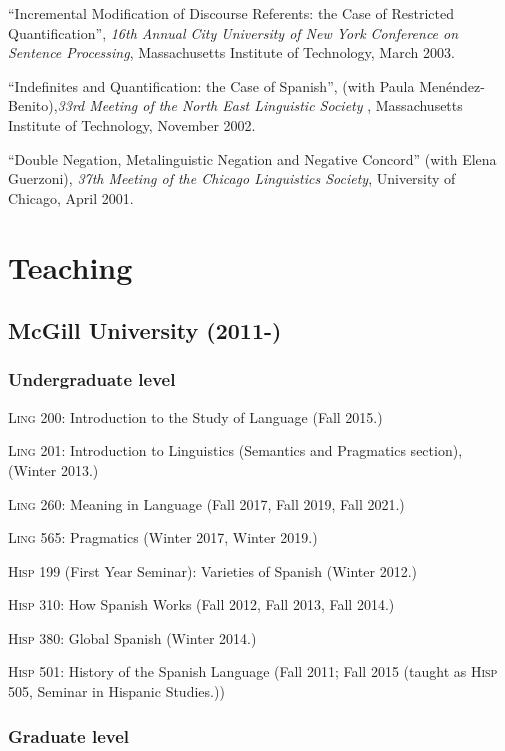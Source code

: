 \documentclass[11pt]{article}
\begin{document}
``Incremental Modification of Discourse Referents: the Case of Restricted Quantification'', \textit{16th Annual City University of New York Conference on Sentence Processing}, Massachusetts Institute of Technology, March 2003. 

``Indefinites and Quantification: the Case of Spanish'', (with Paula Men\'endez-Benito),\textit{33rd
  Meeting of the North East Linguistic Society} , Massachusetts Institute of Technology,  November 2002. 

``Double Negation, Metalinguistic Negation and Negative
Concord'' (with Elena Guerzoni), \textit{37th Meeting of the Chicago
  Linguistics Society}, University of Chicago, April 2001. 

\section*{Teaching}

\subsection*{McGill University (2011-)}

\subsubsection*{Undergraduate level}

\textsc{Ling} 200: Introduction to the Study of Language (Fall 2015.)

\textsc{Ling} 201: Introduction to Linguistics (Semantics and Pragmatics
section), (Winter 2013.)

\textsc{Ling} 260: Meaning in Language (Fall 2017, Fall 2019, Fall 2021.)

\textsc{Ling} 565: Pragmatics (Winter 2017, Winter 2019.)

\textsc{Hisp} 199 (First Year Seminar): Varieties of Spanish (Winter 2012.)

\textsc{Hisp} 310: How Spanish Works (Fall 2012, Fall 2013, Fall 2014.)

\textsc{Hisp} 380: Global Spanish (Winter 2014.)

\textsc{Hisp} 501: History of the Spanish Language (Fall 2011; Fall 2015 (taught as \textsc{Hisp} 505, Seminar in Hispanic Studies.))



\subsubsection*{Graduate level}
\end{document}
